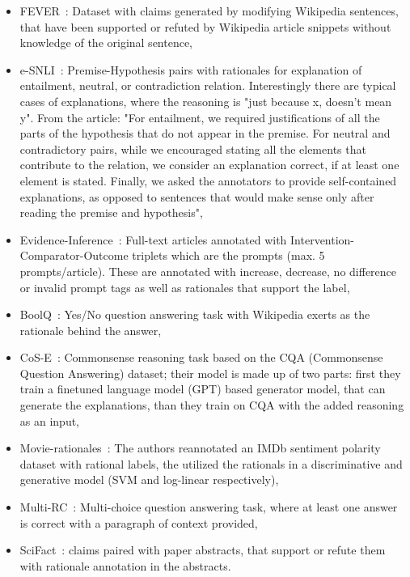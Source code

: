 \documentclass[]{article}
\begin{document}
\begin{itemize}
	\item FEVER~\cite{Thorne:2018}: Dataset with claims generated by modifying Wikipedia sentences, that have been supported or refuted by Wikipedia article snippets without knowledge of the original sentence,
	\item e-SNLI~\cite{Camburu:2018}: Premise-Hypothesis pairs with rationales for explanation of entailment, neutral, or contradiction relation. Interestingly there are typical cases of explanations, where the reasoning is "just because x, doesn't mean y". From the article: "For entailment, we required justifications of all the parts of the hypothesis that do not appear in the premise. For neutral and contradictory pairs, while we encouraged stating all the
	elements that contribute to the relation, we consider an explanation correct, if at least one element is stated. Finally, we asked the annotators to provide self-contained explanations, as opposed to
	sentences that would make sense only after reading the premise and hypothesis",
	\item Evidence-Inference~\cite{DeYoung:2020b}: Full-text articles annotated with Intervention-Comparator-Outcome triplets which are the prompts (max. 5 prompts/article). These are annotated with increase, decrease, no difference or invalid prompt tags as well as rationales that support the label,
	\item BoolQ~\cite{Clark:2019}: Yes/No question answering task with Wikipedia exerts as the rationale behind the answer, 
	\item CoS-E~\cite{Rajani:2019}: Commonsense reasoning task based on the CQA (Commonsense Question Answering) dataset; their model is made up of two parts: first they train a finetuned language model (GPT) based generator model, that can generate the explanations, than they train on CQA with the added reasoning as an input,
	\item Movie-rationales~\cite{Zaidan:2007,Zaidan:2008}: The authors reannotated an IMDb sentiment polarity dataset with rational labels, the utilized the rationals in a discriminative and generative model (SVM and log-linear respectively), 
	\item Multi-RC~\cite{Khashabi:2018}: Multi-choice question answering task, where at least one answer is correct with a paragraph of context provided,
	\item SciFact~\cite{Wadden:2020}: claims paired with paper abstracts, that support or refute them with rationale annotation in the abstracts.
\end{itemize}
\end{document}
